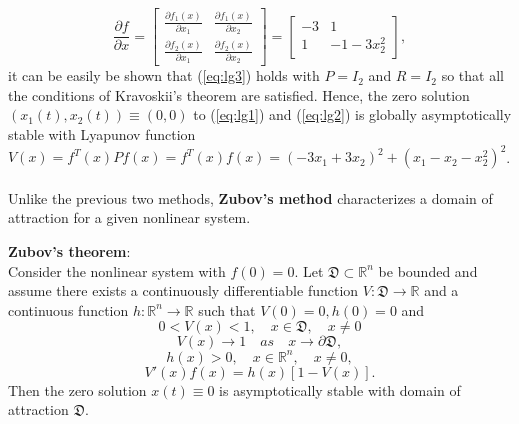\documentclass[a4paper]{report}
\theoremstyle{definition}
\begin{document}
\begin{equation}
\frac{\partial f}{\partial x}=\begin{bmatrix}
\frac{\partial f_1(x)}{\partial x_1} & \frac{\partial f_1(x)}{\partial x_2}\\
\frac{\partial f_2(x)}{\partial x_1} & \frac{\partial f_2(x)}{\partial x_2}
\end{bmatrix}=\begin{bmatrix}
-3 & 1\\
1 & -1-3x_2^2
\end{bmatrix},
\end{equation}
it can be easily be shown that (\ref{eq:lg3}) holds with $P=I_2$ and $R=I_2$ so that all the conditions of Kravoskii's theorem are satisfied. Hence, the zero solution $(x_1(t),x_2(t))\equiv (0,0)$ to (\ref{eq:lg1}) and (\ref{eq:lg2}) is globally asymptotically stable with Lyapunov function $V(x)=f^T(x)Pf(x)=f^T(x)f(x)=(-3x_1+3x_2)^2+(x_1-x_2-x_2^2)^2$.
\\
\\
Unlike the previous two methods, \textbf{Zubov's method} characterizes  a domain of attraction for a given nonlinear system.
\\
\begin{mdframed}[backgroundcolor=airforceblue!25] 
\textbf{Zubov's theorem}:
\\
Consider the nonlinear system with $f(0)=0$. Let $\mathfrak{D}\subset\mathbb{R}^n$ be bounded and assume there exists a continuously differentiable function $V:\mathfrak{D}\rightarrow\mathbb{R}$ and a continuous function $h:\mathbb{R}^n\rightarrow\mathbb{R}$ such that $V(0)=0, h(0)=0$ and
\begin{equation}
0<V(x)<1, \quad x\in\mathfrak{D}, \quad x\not= 0 
\label{eq:lg7}
\end{equation}
\begin{equation}
V(x)\rightarrow 1 \quad as \quad x\rightarrow\partial \mathfrak{D}, 
\label{eq:lg8}
\end{equation}
\begin{equation}
h(x)>0, \quad x\in\mathbb{R}^n, \quad x\not= 0,
\label{eq:lg9}
\end{equation}
\begin{equation}
V'(x)f(x)=h(x)[1-V(x)].
\label{eq:lg10}
\end{equation}
Then the zero solution $x(t)\equiv 0$ is asymptotically stable with domain of attraction $\mathfrak{D}$.
\end{mdframed}
\end{document}

